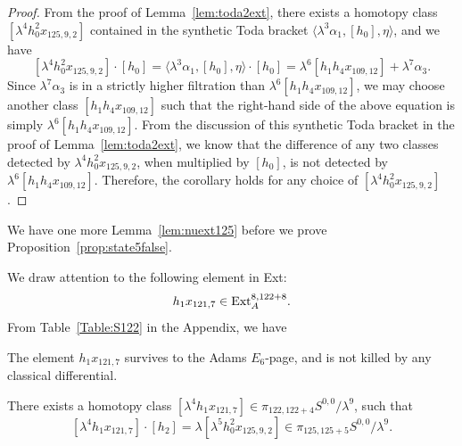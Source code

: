 \documentclass{amsart}
\numberwithin{equation}{section}
\begin{document}
\begin{proof}
    From the proof of Lemma~\ref{lem:toda2ext}, there exists a homotopy class $[\lambda^4 h_0^2x_{125,9,2}]$ contained in the synthetic Toda bracket $ \langle \lambda^3 \alpha_1, [h_0], \eta \rangle$, and we have
    $$[\lambda^4 h_0^2x_{125,9,2}] \cdot [h_0] = \langle \lambda^3 \alpha_1, [h_0], \eta \rangle \cdot [h_0] = \lambda^6 [h_1h_4x_{109,12}] + \lambda^7 \alpha_3.$$
    Since $\lambda^7 \alpha_3$ is in a strictly higher filtration than $\lambda^6 [h_1h_4x_{109,12}]$, we may choose another class $[h_1h_4x_{109,12}]$ such that the right-hand side of the above equation is simply $\lambda^6 [h_1h_4x_{109,12}]$. From the discussion of this synthetic Toda bracket in the proof of Lemma~\ref{lem:toda2ext}, we know that the difference of any two classes detected by $\lambda^4 h_0^2x_{125,9,2}$, when multiplied by $[h_0]$, is not detected by $\lambda^6 [h_1h_4x_{109,12}]$. Therefore, the corollary holds for any choice of $[\lambda^4 h_0^2x_{125,9,2}]$.
\end{proof}







%
%


%
%




%
%


%
%
%
%

We have one more Lemma~\ref{lem:nuext125} before we prove Proposition~\ref{prop:state5false}.

We draw attention to the following element in Ext:
$$h_1x_{121,7} \in \mathrm{Ext}_A^{8,122+8}.$$
From Table~\ref{Table:S122} in the Appendix, we have
\begin{fact} \label{fact:h_1_mul_x_121_7}\label{fact:h1x1217}
    The element $h_1x_{121,7}$ survives to the Adams $E_6$-page, and is not killed by any classical differential.
\end{fact}

\begin{lemma} \label{lem:nuext125}
    There exists a homotopy class $[\lambda^4 h_1 x_{121,7}] \in \pi_{122,122+4}S^{0,0}/\lambda^9$, such that 
    $$[\lambda^4 h_1 x_{121,7}] \cdot [h_2] = \lambda [\lambda^5 h_0^2 x_{125,9,2}] \in \pi_{125,125+5} S^{0,0}/\lambda^9.$$
\end{lemma}
\end{document}
